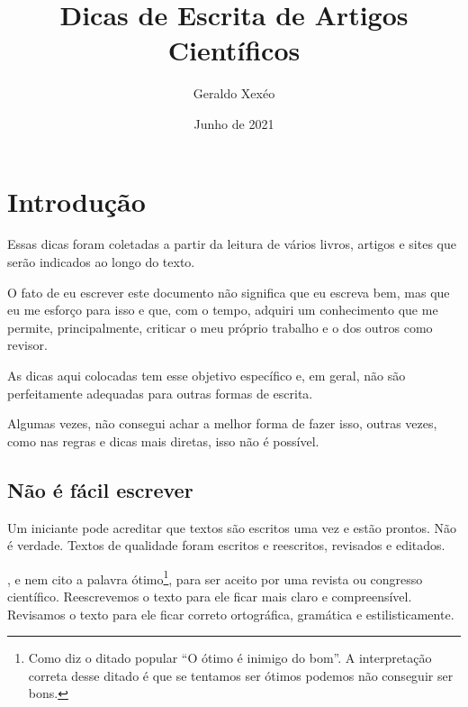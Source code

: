 \documentclass[openany]{book}
\title{Dicas de Escrita de Artigos Científicos}
\author{Geraldo Xexéo}
\date{Junho de 2021}
\begin{document}
\frontmatter

\maketitle

\tableofcontents

\mainmatter

\chapter{Introdução}
 Essas dicas foram coletadas a partir da leitura de vários livros, artigos e sites que serão indicados ao longo do texto.

O fato de eu escrever este documento não significa que eu escreva bem, mas que eu me esforço para isso e que, com o tempo, adquiri um conhecimento que me permite, principalmente, criticar o meu próprio trabalho e o dos outros como revisor.

As dicas aqui colocadas tem esse objetivo específico e, em geral, não são perfeitamente adequadas para outras formas de escrita.

 Algumas vezes, não consegui achar a melhor forma de fazer isso, outras vezes, como nas regras e dicas mais diretas, isso não é possível.

\section{Não é fácil escrever}

 Um iniciante pode acreditar que textos são escritos uma vez e estão prontos. Não é verdade. Textos de qualidade foram escritos e reescritos, revisados e editados.

, e nem cito a palavra ótimo\footnote{Como diz o ditado popular ``O ótimo é inimigo do bom''. A interpretação correta desse ditado é que se tentamos ser ótimos podemos não conseguir ser bons.}, para ser aceito por uma revista ou congresso científico. Reescrevemos o texto para ele ficar mais claro e  compreensível. Revisamos o texto para ele ficar correto ortográfica, gramática e estilisticamente.
\end{document}
